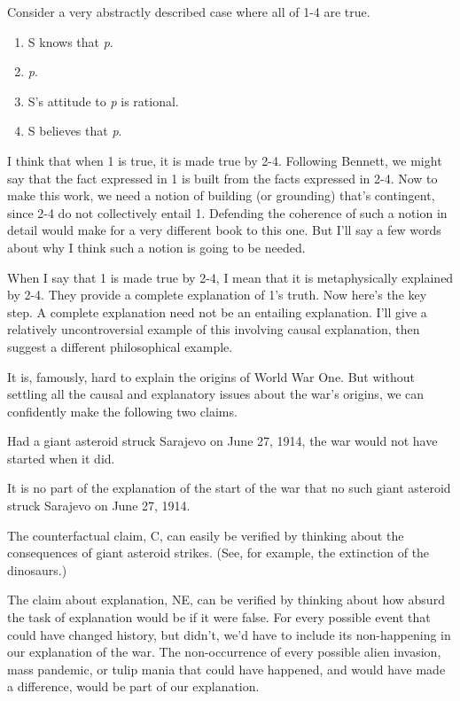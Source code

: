 \documentclass[
  10pt,
  letterpaper,
  twoside]{scrbook}
\providecommand{\tightlist}{%
  \setlength{\itemsep}{0pt}\setlength{\parskip}{0pt}}\usepackage{longtable,booktabs,array}
\begin{document}
Consider a very abstractly described case where all of 1-4 are true.

\begin{enumerate}
\def\labelenumi{\arabic{enumi}.}
\tightlist
\item
  S knows that \emph{p}.
\item
  \emph{p}.
\item
  S's attitude to \emph{p} is rational.
\item
  S believes that \emph{p}.
\end{enumerate}

I think that when 1 is true, it is made true by 2-4. Following Bennett,
we might say that the fact expressed in 1 is built from the facts
expressed in 2-4. Now to make this work, we need a notion of building
(or grounding) that's contingent, since 2-4 do not collectively entail
1. Defending the coherence of such a notion in detail would make for a
very different book to this one. But I'll say a few words about why I
think such a notion is going to be needed.

When I say that 1 is made true by 2-4, I mean that it is metaphysically
explained by 2-4. They provide a complete explanation of 1's truth. Now
here's the key step. A complete explanation need not be an entailing
explanation. I'll give a relatively uncontroversial example of this
involving causal explanation, then suggest a different philosophical
example.

It is, famously, hard to explain the origins of World War One. But
without settling all the causal and explanatory issues about the war's
origins, we can confidently make the following two claims.

\begin{description}
\tightlist
\item[C]
Had a giant asteroid struck Sarajevo on June 27, 1914, the war would not
have started when it did.
\item[NE]
It is no part of the explanation of the start of the war that no such
giant asteroid struck Sarajevo on June 27, 1914.
\end{description}

The counterfactual claim, C, can easily be verified by thinking about
the consequences of giant asteroid strikes. (See, for example, the
extinction of the dinosaurs.)

The claim about explanation, NE, can be verified by thinking about how
absurd the task of explanation would be if it were false. For every
possible event that could have changed history, but didn't, we'd have to
include its non-happening in our explanation of the war. The
non-occurrence of every possible alien invasion, mass pandemic, or tulip
mania that could have happened, and would have made a difference, would
be part of our explanation.
\end{document}
